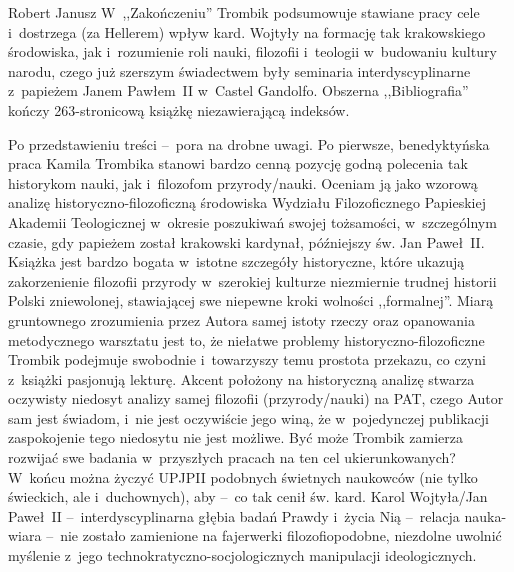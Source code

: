 \begin{newrevplenv}{Robert Janusz}
W~,,Zakończeniu'' Trombik podsumowuje stawiane pracy cele i~dostrzega (za Hellerem) wpływ kard. Wojtyły na formację tak krakowskiego środowiska, jak i~rozumienie roli nauki, filozofii i~teologii w~budowaniu kultury narodu, czego już szerszym świadectwem były seminaria interdyscyplinarne z~papieżem Janem Pawłem~II w~Castel Gandolfo. Obszerna ,,Bibliografia'' kończy 263-stronicową książkę niezawierającą indeksów.

Po przedstawieniu treści --~pora na drobne uwagi. Po pierwsze, benedyktyńska praca Kamila Trombika stanowi bardzo cenną pozycję godną polecenia tak historykom nauki, jak i~filozofom przyrody/nauki. Oceniam ją jako wzorową analizę historyczno-filozoficzną środowiska Wydziału Filozoficznego Papieskiej Akademii Teologicznej w~okresie poszukiwań swojej tożsamości, w~szczególnym czasie, gdy papieżem został krakowski kardynał, późniejszy św. Jan Paweł~II. Książka jest bardzo bogata w~istotne szczegóły historyczne, które ukazują zakorzenienie filozofii przyrody w~szerokiej kulturze niezmiernie trudnej historii Polski zniewolonej, stawiającej swe niepewne kroki wolności ,,formalnej''. Miarą gruntownego zrozumienia przez Autora samej istoty rzeczy oraz opanowania metodycznego warsztatu jest to, że niełatwe problemy historyczno-filozoficzne Trombik podejmuje swobodnie i~towarzyszy temu prostota przekazu, co czyni z~książki pasjonują lekturę. Akcent położony na historyczną analizę stwarza oczywisty niedosyt analizy samej filozofii (przyrody/nauki) na PAT, czego Autor sam jest świadom, i~nie jest oczywiście jego winą, że w~pojedynczej publikacji zaspokojenie tego niedosytu nie jest możliwe. Być może Trombik zamierza rozwijać swe badania w~przyszłych pracach na ten cel ukierunkowanych? W~końcu można życzyć UPJPII podobnych świetnych naukowców (nie tylko świeckich, ale i~duchownych), aby --~co tak cenił św. kard. Karol Wojtyła/Jan Paweł~II --~interdyscyplinarna głębia badań Prawdy i~życia Nią --~relacja nauka-wiara --~nie zostało zamienione na fajerwerki filozofiopodobne, niezdolne uwolnić myślenie z~jego technokratyczno-socjologicznych manipulacji ideologicznych.





\vspace{5mm}%
\begin{flushright}
{\chaptitleeng\color{black!50}{An important step towards understanding the identity of the philosophy of the Interdisciplinary Research Center --~Lorem ipsumn}}
\end{flushright}


\end{newrevplenv}
